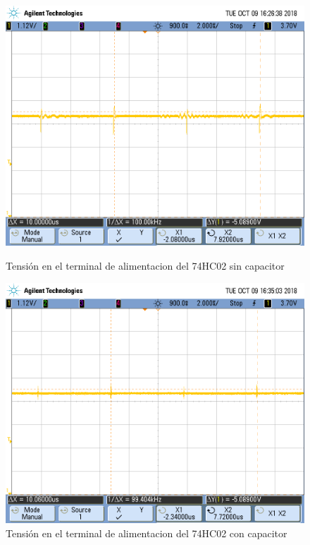 \begin{figure}[H]
\begin{center}
  \begin{minipage}[b]{0.4\textwidth}
  	\begin{center}
  		\includegraphics[scale=0.18]{imagenes/sin_capacitor.png}
  	\end{center}
  \caption{Tensión en el terminal de alimentacion del 74HC02 sin capacitor}
  \label{4_fig1} 
  \end{minipage}
  \begin{minipage}[b]{0.4\textwidth}
    \begin{center}
  		\includegraphics[scale=0.18]{imagenes/con_capacitor.png}
	\end{center}
  \caption{Tensión en el terminal de alimentacion del 74HC02 con capacitor}
  \label{4_fig2}
 \end{minipage}
\end{center}
\end{figure}






